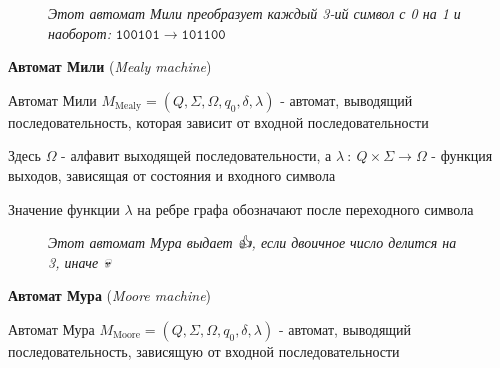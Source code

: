 \documentclass[12pt]{article}
\begin{document}
\begin{enumerate}
\begin{minipage}{\linewidth}
\begin{figure}
                \footnotesize
                \textit{Этот автомат Мили преобразует каждый 3-ий символ с 0 на 1 и наоборот:} $\mathtt{100101} \to \mathtt{101100}$

            \end{figure}

            \item \textbf{Автомат Мили} (\textit{Mealy machine})

            Автомат Мили $M_{\text{Mealy}} = (Q, \Sigma, \Omega, q_0, \delta, \lambda)$ - автомат, выводящий последовательность, которая зависит от входной последовательности

            Здесь $\Omega$ - алфавит выходящей последовательности, а
            $\lambda \ : \ Q \times \Sigma \to \Omega$ - функция выходов, зависящая от состояния и входного символа

            Значение функции $\lambda$ на ребре графа обозначают после переходного символа


        \end{minipage}

        \begin{minipage}{\linewidth}
            \begin{figure}

                \footnotesize
                \textit{Этот автомат Мура выдает {\Large 👍}, если двоичное число делится на 3, иначе {\Large 💀}}


            \end{figure}

            \item \textbf{Автомат Мура} (\textit{Moore machine})

            Автомат Мура $M_{\text{Moore}} = (Q, \Sigma, \Omega, q_0, \delta, \lambda)$ - автомат, выводящий последовательность, зависящую от входной последовательности


\end{minipage}
\end{enumerate}
\end{document}
